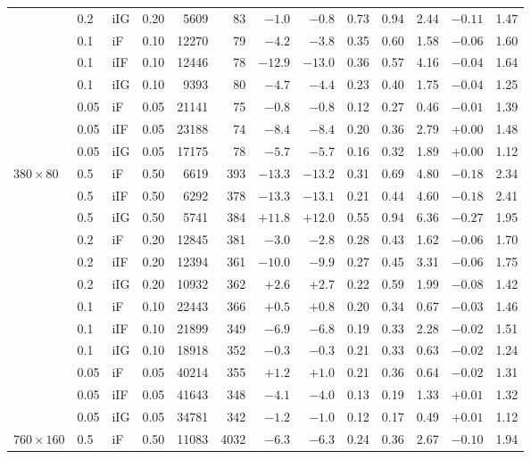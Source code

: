 \begin{tabular}{@{}lllrrrrrrrrrr@{}}
 & 0.2 & iIG & 0.20 & 5609 & 83 & $-1.0$ & $-0.8$ & 0.73 & 0.94 & 2.44 & $-0.11$ & 1.47 \\
 & 0.1 & iF & 0.10 & 12270 & 79 & $-4.2$ & $-3.8$ & 0.35 & 0.60 & 1.58 & $-0.06$ & 1.60 \\
 & 0.1 & iIF & 0.10 & 12446 & 78 & $-12.9$ & $-13.0$ & 0.36 & 0.57 & 4.16 & $-0.04$ & 1.64 \\
 & 0.1 & iIG & 0.10 & 9393 & 80 & $-4.7$ & $-4.4$ & 0.23 & 0.40 & 1.75 & $-0.04$ & 1.25 \\
 & 0.05 & iF & 0.05 & 21141 & 75 & $-0.8$ & $-0.8$ & 0.12 & 0.27 & 0.46 & $-0.01$ & 1.39 \\
 & 0.05 & iIF & 0.05 & 23188 & 74 & $-8.4$ & $-8.4$ & 0.20 & 0.36 & 2.79 & $+0.00$ & 1.48 \\
 & 0.05 & iIG & 0.05 & 17175 & 78 & $-5.7$ & $-5.7$ & 0.16 & 0.32 & 1.89 & $+0.00$ & 1.12 \\
\midrule
$380\times80$ & 0.5 & iF & 0.50 & 6619 & 393 & $-13.3$ & $-13.2$ & 0.31 & 0.69 & 4.80 & $-0.18$ & 2.34 \\
 & 0.5 & iIF & 0.50 & 6292 & 378 & $-13.3$ & $-13.1$ & 0.21 & 0.44 & 4.60 & $-0.18$ & 2.41 \\
 & 0.5 & iIG & 0.50 & 5741 & 384 & $+11.8$ & $+12.0$ & 0.55 & 0.94 & 6.36 & $-0.27$ & 1.95 \\
 & 0.2 & iF & 0.20 & 12845 & 381 & $-3.0$ & $-2.8$ & 0.28 & 0.43 & 1.62 & $-0.06$ & 1.70 \\
 & 0.2 & iIF & 0.20 & 12394 & 361 & $-10.0$ & $-9.9$ & 0.27 & 0.45 & 3.31 & $-0.06$ & 1.75 \\
 & 0.2 & iIG & 0.20 & 10932 & 362 & $+2.6$ & $+2.7$ & 0.22 & 0.59 & 1.99 & $-0.08$ & 1.42 \\
 & 0.1 & iF & 0.10 & 22443 & 366 & $+0.5$ & $+0.8$ & 0.20 & 0.34 & 0.67 & $-0.03$ & 1.46 \\
 & 0.1 & iIF & 0.10 & 21899 & 349 & $-6.9$ & $-6.8$ & 0.19 & 0.33 & 2.28 & $-0.02$ & 1.51 \\
 & 0.1 & iIG & 0.10 & 18918 & 352 & $-0.3$ & $-0.3$ & 0.21 & 0.33 & 0.63 & $-0.02$ & 1.24 \\
 & 0.05 & iF & 0.05 & 40214 & 355 & $+1.2$ & $+1.0$ & 0.21 & 0.36 & 0.64 & $-0.02$ & 1.31 \\
 & 0.05 & iIF & 0.05 & 41643 & 348 & $-4.1$ & $-4.0$ & 0.13 & 0.19 & 1.33 & $+0.01$ & 1.32 \\
 & 0.05 & iIG & 0.05 & 34781 & 342 & $-1.2$ & $-1.0$ & 0.12 & 0.17 & 0.49 & $+0.01$ & 1.12 \\
\midrule
$760\times160$ & 0.5 & iF & 0.50 & 11083 & 4032 & $-6.3$ & $-6.3$ & 0.24 & 0.36 & 2.67 & $-0.10$ & 1.94 \\

\end{tabular}
